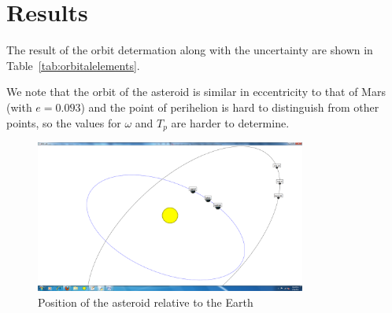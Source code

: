 \documentclass[11pt,a4paper]{article}
\begin{document}
\begin{table}[!t]
\centering
{}
\caption{V-Magnitude of 1951 Lick \label{tab:vmag}}
\end{table}

\section{Results}

The result of the orbit determation along with the uncertainty are shown in Table~\ref{tab:orbitalelements}.

\begin{table}[!t]
\centering
{}
\caption{Measured orbital elements \label{tab:orbitalelements}}
\end{table}

We note that the orbit of the asteroid is similar in eccentricity to that of Mars (with $e = 0.093$\cite{bib:horizons}) and the point of perihelion is hard to distinguish from other points, so the values for $\omega$ and $T_p$ are harder to determine. 

\begin{figure}[!t]
\centering
\includegraphics[width=3.5in]{LICK_Orbit.png}
\caption{Position of the asteroid relative to the Earth}
\label{fig_sim}
\end{figure}
\end{document}

